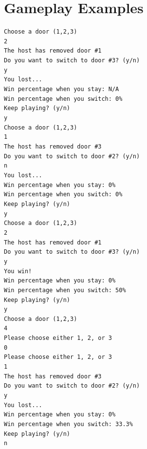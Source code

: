 \documentclass{article}
\begin{document}
\section*{Gameplay Examples}
\texttt{Choose a door (1,2,3)\\
	2\\
	The host has removed door \#1\\
	Do you want to switch to door \#3? (y/n)\\
	y\\
	You lost...\\
	Win percentage when you stay: N/A\\
	Win percentage when you switch: 0\%\\
	Keep playing? (y/n)\\
	y\\
	Choose a door (1,2,3)\\
	1\\
	The host has removed door \#3\\
	Do you want to switch to door \#2? (y/n)\\
	n\\
	You lost...\\
	Win percentage when you stay: 0\%\\
	Win percentage when you switch: 0\%\\
	Keep playing? (y/n)\\
	y\\
	Choose a door (1,2,3)\\
	2\\
	The host has removed door \#1\\
	Do you want to switch to door \#3? (y/n)\\
	y\\
	You win!\\
	Win percentage when you stay: 0\%\\
	Win percentage when you switch: 50\%\\
	Keep playing? (y/n)\\
	y\\
	Choose a door (1,2,3)\\
	4\\
	Please choose either 1, 2, or 3\\
	0\\
	Please choose either 1, 2, or 3\\
	1\\
	The host has removed door \#3\\
	Do you want to switch to door \#2? (y/n)\\
	y\\
	You lost...\\
	Win percentage when you stay: 0\%\\
	Win percentage when you switch: 33.3\%\\
	Keep playing? (y/n)\\
	n
}
\end{document}
